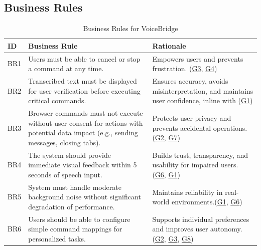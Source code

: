 \documentclass[11pt]{article}
\begin{document}
\subsection{Business Rules}

\begin{table}[H]
\centering
\begin{tabularx}{\textwidth}{p{1cm} X X}
\toprule
\textbf{ID} & \textbf{Business Rule} & \textbf{Rationale} \\
\midrule
BR1 & Users must be able to cancel or stop a command at any time. & Empowers users and prevents frustration. (\hyperref[tab:project-goals]{G3}, \hyperref[tab:project-goals]{G4}) \\
BR2 & Transcribed text must be displayed for user verification before executing critical commands. & Ensures accuracy, avoids misinterpretation, and maintains user confidence, inline with (\hyperref[tab:project-goals]{G1}) \\
BR3 & Browser commands must not execute without user consent for actions with potential data impact (e.g., sending messages, closing tabs). & Protects user privacy and prevents accidental operations. (\hyperref[tab:project-goals]{G2}, \hyperref[tab:project-goals]{G7}) \\
BR4 & The system should provide immediate visual feedback within 5 seconds of speech input. & Builds trust, transparency, and usability for impaired users. (\hyperref[tab:project-goals]{G6}, \hyperref[tab:project-goals]{G1}) \\
BR5 & System must handle moderate background noise without significant degradation of performance. & Maintains reliability in real-world environments.(\hyperref[tab:project-goals]{G1}, \hyperref[tab:project-goals]{G6}) \\
BR6 & Users should be able to configure simple command mappings for personalized tasks. & Supports individual preferences and improves user autonomy. (\hyperref[tab:project-goals]{G2}, \hyperref[tab:project-goals]{G3}, \hyperref[tab:project-goals]{G8}) \\
\bottomrule
\end{tabularx}
\caption{Business Rules for VoiceBridge}
\end{table}
\end{document}
